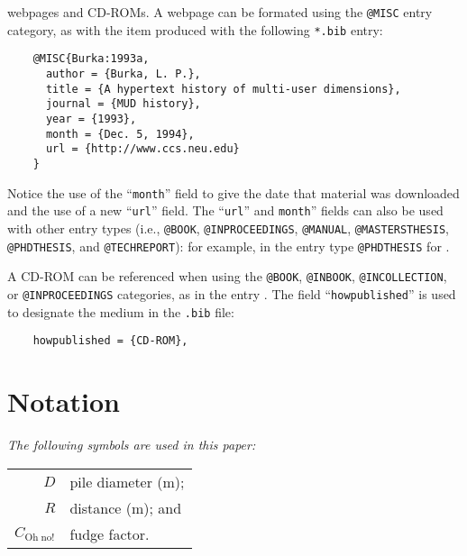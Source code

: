 \documentclass[Journal,letterpaper]{ascelike-new}
\begin{document}
webpages and CD-ROMs.  A webpage can be formated using the
\texttt{@MISC} entry category, as with the item \cite{Burka:1993a} produced
with the following \texttt{*.bib} entry:
\begin{verbatim}
    @MISC{Burka:1993a,
      author = {Burka, L. P.},
      title = {A hypertext history of multi-user dimensions},
      journal = {MUD history},
      year = {1993},
      month = {Dec. 5, 1994},
      url = {http://www.ccs.neu.edu}
    }
\end{verbatim}
Notice the use of the ``\texttt{month}'' field to give the date that material
was downloaded and the use of a new ``\texttt{url}'' field.
The ``\texttt{url}'' and \texttt{month}'' 
fields can also be used with other entry types
(i.e., \texttt{@BOOK}, \texttt{@INPROCEEDINGS}, \texttt{@MANUAL},
\texttt{@MASTERSTHESIS}, \texttt{@PHDTHESIS}, and \texttt{@TECHREPORT}):
for example, in the entry type \texttt{@PHDTHESIS} for \cite{Wichtmann:2005a}.
%
\par
A CD-ROM can be referenced when using the \texttt{@BOOK}, \texttt{@INBOOK},
\texttt{@INCOLLECTION}, or \texttt{@INPROCEEDINGS} categories, 
as in the entry \cite{Liggett:1998a}.
The field ``\texttt{howpublished}'' is used to designate the medium
in the \texttt{.bib} file:
\begin{verbatim}
    howpublished = {CD-ROM},
\end{verbatim}
%
\pagebreak
%
\appendix
%
%
\section{Notation}
\label{app:notation}
\emph{The following symbols are used in this paper:}%
\nopagebreak
\par
\begin{tabular}{r  @{\hspace{1em}=\hspace{1em}}  l}
$D$                    & pile diameter (m); \\
$R$                    & distance (m);      and\\
$C_{\mathrm{Oh\;no!}}$ & fudge factor.
\end{tabular}
\end{document}
